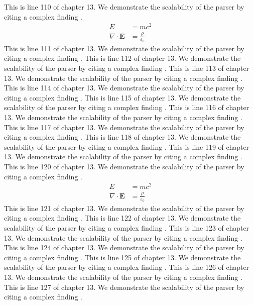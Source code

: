 This is line 110 of chapter 13. We demonstrate the scalability of the parser by citing a complex finding \cite{ref13_110}.
\begin{align*}
  E &= mc^2 \\
  \nabla \cdot \mathbf{E} &= \frac{\rho}{\varepsilon_0}
\end{align*}
This is line 111 of chapter 13. We demonstrate the scalability of the parser by citing a complex finding \cite{ref13_111}.
This is line 112 of chapter 13. We demonstrate the scalability of the parser by citing a complex finding \cite{ref13_112}.
This is line 113 of chapter 13. We demonstrate the scalability of the parser by citing a complex finding \cite{ref13_113}.
This is line 114 of chapter 13. We demonstrate the scalability of the parser by citing a complex finding \cite{ref13_114}.
This is line 115 of chapter 13. We demonstrate the scalability of the parser by citing a complex finding \cite{ref13_115}.
This is line 116 of chapter 13. We demonstrate the scalability of the parser by citing a complex finding \cite{ref13_116}.
This is line 117 of chapter 13. We demonstrate the scalability of the parser by citing a complex finding \cite{ref13_117}.
This is line 118 of chapter 13. We demonstrate the scalability of the parser by citing a complex finding \cite{ref13_118}.
This is line 119 of chapter 13. We demonstrate the scalability of the parser by citing a complex finding \cite{ref13_119}.
This is line 120 of chapter 13. We demonstrate the scalability of the parser by citing a complex finding \cite{ref13_120}.
\begin{align*}
  E &= mc^2 \\
  \nabla \cdot \mathbf{E} &= \frac{\rho}{\varepsilon_0}
\end{align*}
This is line 121 of chapter 13. We demonstrate the scalability of the parser by citing a complex finding \cite{ref13_121}.
This is line 122 of chapter 13. We demonstrate the scalability of the parser by citing a complex finding \cite{ref13_122}.
This is line 123 of chapter 13. We demonstrate the scalability of the parser by citing a complex finding \cite{ref13_123}.
This is line 124 of chapter 13. We demonstrate the scalability of the parser by citing a complex finding \cite{ref13_124}.
This is line 125 of chapter 13. We demonstrate the scalability of the parser by citing a complex finding \cite{ref13_125}.
This is line 126 of chapter 13. We demonstrate the scalability of the parser by citing a complex finding \cite{ref13_126}.
This is line 127 of chapter 13. We demonstrate the scalability of the parser by citing a complex finding \cite{ref13_127}.

